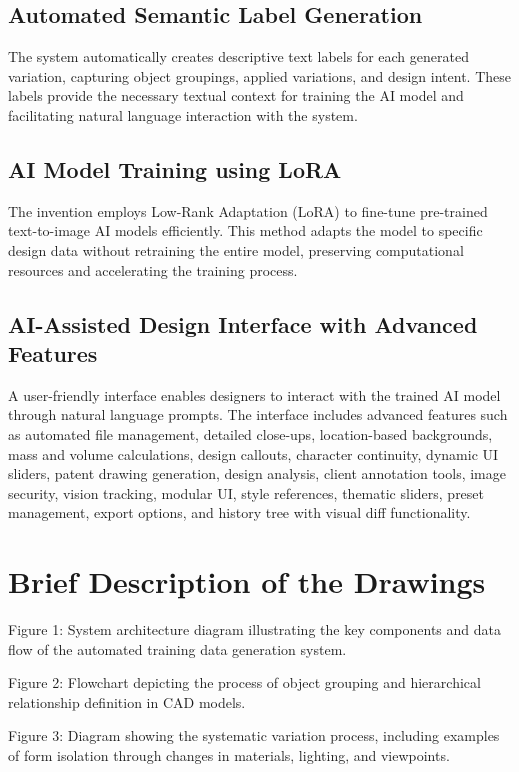 \documentclass{article}
\begin{document}
\subsection{Automated Semantic Label Generation}
The system automatically creates descriptive text labels for each generated variation, capturing object groupings, applied variations, and design intent. These labels provide the necessary textual context for training the AI model and facilitating natural language interaction with the system.

\subsection{AI Model Training using LoRA}
The invention employs Low-Rank Adaptation (LoRA) to fine-tune pre-trained text-to-image AI models efficiently. This method adapts the model to specific design data without retraining the entire model, preserving computational resources and accelerating the training process.

\subsection{AI-Assisted Design Interface with Advanced Features}
A user-friendly interface enables designers to interact with the trained AI model through natural language prompts. The interface includes advanced features such as automated file management, detailed close-ups, location-based backgrounds, mass and volume calculations, design callouts, character continuity, dynamic UI sliders, patent drawing generation, design analysis, client annotation tools, image security, vision tracking, modular UI, style references, thematic sliders, preset management, export options, and history tree with visual diff functionality.

\section{Brief Description of the Drawings}

Figure 1: System architecture diagram illustrating the key components and data flow of the automated training data generation system.

Figure 2: Flowchart depicting the process of object grouping and hierarchical relationship definition in CAD models.

Figure 3: Diagram showing the systematic variation process, including examples of form isolation through changes in materials, lighting, and viewpoints.
\end{document}
